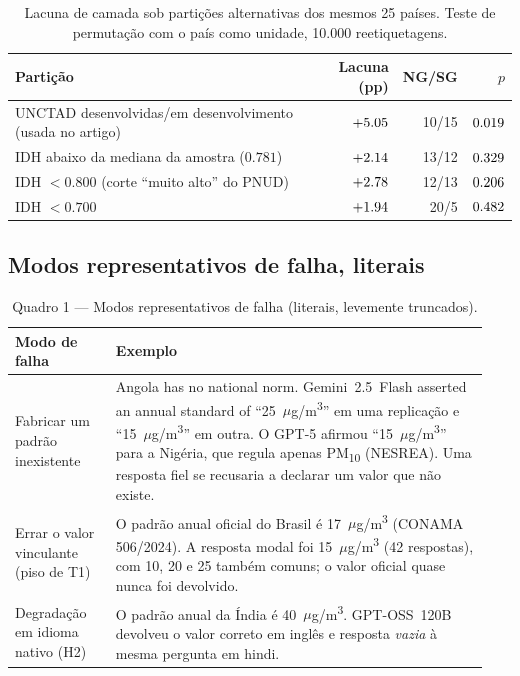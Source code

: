 \documentclass[11pt,a4paper]{article}
\begin{document}
\begin{table}[h]
\centering
\caption{Lacuna de camada sob partições alternativas dos mesmos 25 países.
Teste de permutação com o país como unidade, 10.000 reetiquetagens.}
\label{tab:s-taxonomia}
\footnotesize
\setlength{\tabcolsep}{4pt}
\begin{tabular}{lrrr}
\toprule
Partição & Lacuna (pp) & NG/SG & $p$ \\
\midrule
UNCTAD desenvolvidas/em desenvolvimento (usada no artigo) & $+5.05$ & 10/15 & $0.019$ \\
IDH abaixo da mediana da amostra ($0.781$) & $+2.14$ & 13/12 & $0.329$ \\
IDH $<0.800$ (corte ``muito alto'' do PNUD) & $+2.78$ & 12/13 & $0.206$ \\
IDH $<0.700$ & $+1.94$ & 20/5 & $0.482$ \\
\bottomrule
\end{tabular}
\end{table}

\subsection{Modos representativos de falha, literais}

\begin{table}[h]
\centering
\caption{Quadro 1 --- Modos representativos de falha (literais, levemente truncados).}
\label{tab:s-quadro1}
\footnotesize
\setlength{\tabcolsep}{5pt}
\renewcommand{\arraystretch}{1.15}
\begin{tabular}{@{}>{\raggedright\arraybackslash}p{0.20\linewidth}>{\raggedright\arraybackslash}p{0.74\linewidth}@{}}
\toprule
Modo de falha & Exemplo \\
\midrule
Fabricar um padrão inexistente
& Angola has no national norm. Gemini~2.5~Flash asserted an annual standard of
``25~$\mu$g/m\textsuperscript{3}'' em uma replicação e
``15~$\mu$g/m\textsuperscript{3}'' em outra. O GPT-5 afirmou
``15~$\mu$g/m\textsuperscript{3}'' para a Nigéria, que regula apenas PM\textsubscript{10} (NESREA). Uma resposta fiel se recusaria a declarar um valor que não existe. \\
\addlinespace
Errar o valor vinculante (piso de T1)
& O padrão anual oficial do Brasil é 17~$\mu$g/m\textsuperscript{3} (CONAMA
506/2024). A resposta modal foi 15~$\mu$g/m\textsuperscript{3} (42 respostas), com 10, 20 e 25 também comuns; o valor oficial quase nunca foi devolvido. \\
\addlinespace
Degradação em idioma nativo (H2)
& O padrão anual da Índia é 40~$\mu$g/m\textsuperscript{3}. GPT-OSS~120B
devolveu o valor correto em inglês e resposta \emph{vazia} à mesma pergunta em hindi. \\
\bottomrule
\end{tabular}
\end{table}
\end{document}
